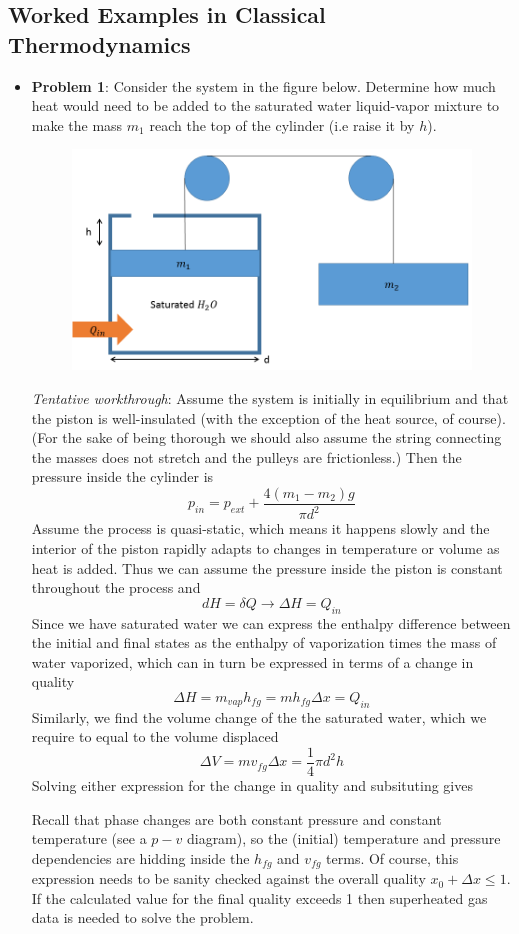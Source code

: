 \documentclass[11pt]{article}
\newcommand{\Item}[1]{\item \textbf{#1}:}
\newcommand{\CenteredBoxed}[1]{\begin{center}\boxed{#1}\end{center}}
\newcommand{\Problem}[1]{\Item{Problem #1}}
\begin{document}
\subsection{Worked Examples in Classical Thermodynamics}
\begin{itemize}
\Problem{1} Consider the system in the figure below. Determine how much heat would need to be added to the saturated water liquid-vapor mixture to make the mass $m_1$ reach the top of the cylinder (i.e raise it by $h$).
\begin{figure}[h]\center\includegraphics[scale=0.5]{Graphics/mass_system.PNG}\end{figure}

\emph{Tentative workthrough}: Assume the system is initially in equilibrium and that the piston is well-insulated (with the exception of the heat source, of course). (For the sake of being thorough we should also assume the string connecting the masses does not stretch and the pulleys are frictionless.) Then the pressure inside the cylinder is
$$p_{in} = p_{ext} + \frac{4(m_1-m_2)g}{\pi d^2}$$
Assume the process is quasi-static, which means it happens slowly and the interior of the piston rapidly adapts to changes in temperature or volume as heat is added. Thus we can assume the pressure inside the piston is constant throughout the process and
$$dH = \delta Q\to \Delta H = Q_{in}$$
Since we have saturated water we can express the enthalpy difference between the initial and final states as the enthalpy of vaporization times the mass of water vaporized, which can in turn be expressed in terms of a change in quality
$$\Delta H = m_{vap}h_{fg} = mh_{fg}\Delta x = Q_{in}$$
Similarly, we find the volume change of the the saturated water, which we require to equal to the volume displaced
$$\Delta V = mv_{fg}\Delta x = \frac{1}{4}\pi d^2h$$
Solving either expression for the change in quality and subsituting gives
\CenteredBoxed{Q_{in} = \frac{h_{fg}}{v_{fg}}\frac{1}{4}\pi d^2h}
Recall that phase changes are both constant pressure and constant temperature (see a $p-v$ diagram), so the (initial) temperature and pressure dependencies are hidding inside the $h_{fg}$ and $v_{fg}$ terms. Of course, this expression needs to be sanity checked against the overall quality $x_0+\Delta x \leq1$. If the calculated value for the final quality exceeds 1 then superheated gas data is needed to solve the problem.\\


\end{itemize}
\end{document}
